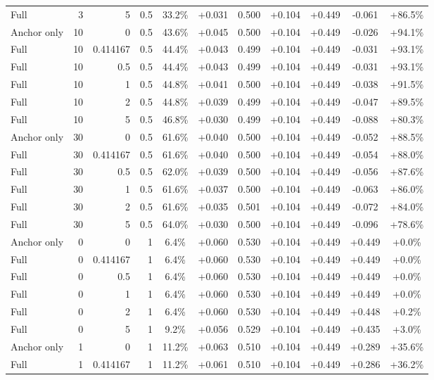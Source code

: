 \begin{table}[htbp]
\begin{tabular}{lrrrccccccc}
Full & 3 & 5 & 0.5 & 33.2\% & +0.031 & 0.500 & +0.104 & +0.449 & -0.061 & +86.5\% \\
Anchor only & 10 & 0 & 0.5 & 43.6\% & +0.045 & 0.500 & +0.104 & +0.449 & -0.026 & +94.1\% \\
Full & 10 & 0.414167 & 0.5 & 44.4\% & +0.043 & 0.499 & +0.104 & +0.449 & -0.031 & +93.1\% \\
Full & 10 & 0.5 & 0.5 & 44.4\% & +0.043 & 0.499 & +0.104 & +0.449 & -0.031 & +93.1\% \\
Full & 10 & 1 & 0.5 & 44.8\% & +0.041 & 0.500 & +0.104 & +0.449 & -0.038 & +91.5\% \\
Full & 10 & 2 & 0.5 & 44.8\% & +0.039 & 0.499 & +0.104 & +0.449 & -0.047 & +89.5\% \\
Full & 10 & 5 & 0.5 & 46.8\% & +0.030 & 0.499 & +0.104 & +0.449 & -0.088 & +80.3\% \\
Anchor only & 30 & 0 & 0.5 & 61.6\% & +0.040 & 0.500 & +0.104 & +0.449 & -0.052 & +88.5\% \\
Full & 30 & 0.414167 & 0.5 & 61.6\% & +0.040 & 0.500 & +0.104 & +0.449 & -0.054 & +88.0\% \\
Full & 30 & 0.5 & 0.5 & 62.0\% & +0.039 & 0.500 & +0.104 & +0.449 & -0.056 & +87.6\% \\
Full & 30 & 1 & 0.5 & 61.6\% & +0.037 & 0.500 & +0.104 & +0.449 & -0.063 & +86.0\% \\
Full & 30 & 2 & 0.5 & 61.6\% & +0.035 & 0.501 & +0.104 & +0.449 & -0.072 & +84.0\% \\
Full & 30 & 5 & 0.5 & 64.0\% & +0.030 & 0.500 & +0.104 & +0.449 & -0.096 & +78.6\% \\
Anchor only & 0 & 0 & 1 & 6.4\% & +0.060 & 0.530 & +0.104 & +0.449 & +0.449 & +0.0\% \\
Full & 0 & 0.414167 & 1 & 6.4\% & +0.060 & 0.530 & +0.104 & +0.449 & +0.449 & +0.0\% \\
Full & 0 & 0.5 & 1 & 6.4\% & +0.060 & 0.530 & +0.104 & +0.449 & +0.449 & +0.0\% \\
Full & 0 & 1 & 1 & 6.4\% & +0.060 & 0.530 & +0.104 & +0.449 & +0.449 & +0.0\% \\
Full & 0 & 2 & 1 & 6.4\% & +0.060 & 0.530 & +0.104 & +0.449 & +0.448 & +0.2\% \\
Full & 0 & 5 & 1 & 9.2\% & +0.056 & 0.529 & +0.104 & +0.449 & +0.435 & +3.0\% \\
Anchor only & 1 & 0 & 1 & 11.2\% & +0.063 & 0.510 & +0.104 & +0.449 & +0.289 & +35.6\% \\
Full & 1 & 0.414167 & 1 & 11.2\% & +0.061 & 0.510 & +0.104 & +0.449 & +0.286 & +36.2\% \\

\end{tabular}
\end{table}
